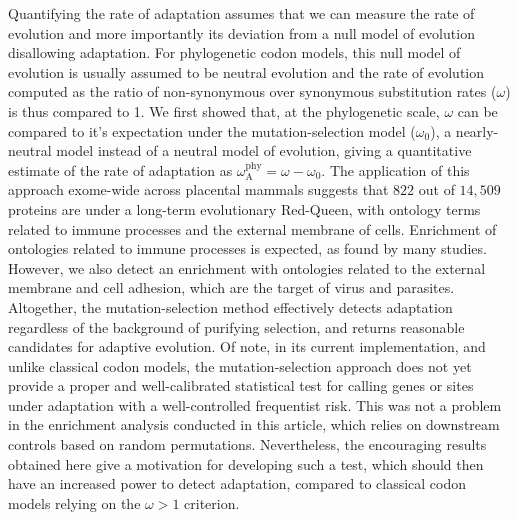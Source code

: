 \documentclass{article}
\newcommand{\rateApop}{\omega_{\mathrm{A}}}
\newcommand{\rateAphy}{\rateApop^{\mathrm{phy}}}
\begin{document}
    Quantifying the rate of adaptation assumes that we can measure the rate of evolution and more importantly its deviation from a null model of evolution disallowing adaptation.
    For phylogenetic codon models, this null model of evolution is usually assumed to be neutral evolution and the rate of evolution computed as the ratio of non-synonymous over synonymous substitution rates ($\omega$) is thus compared to 1.
    We first showed that, at the phylogenetic scale, $\omega$ can be compared to it's expectation under the mutation-selection model ($\omega_{0}$), a nearly-neutral model instead of a neutral model of evolution, giving a quantitative estimate of the rate of adaptation as $\rateAphy = \omega - \omega_{0}$.
    The application of this approach exome-wide across placental mammals suggests that $822$ out of $14,509$ proteins are under a long-term evolutionary Red-Queen, with ontology terms related to immune processes and the external membrane of cells.
    Enrichment of ontologies related to immune processes is expected, as found by many studies\cite{kosiol_patterns_2008, enard_viruses_2016, ebel_high_2017}.
    However, we also detect an enrichment with ontologies related to the external membrane and cell adhesion, which are the target of virus and parasites.
    Altogether, the mutation-selection method effectively detects adaptation regardless of the background of purifying selection, and returns reasonable candidates for adaptive evolution.
    Of note, in its current implementation, and unlike classical codon models\cite{wong_accuracy_2004, yang_paml_2007}, the mutation-selection approach does not yet provide a proper and well-calibrated statistical test for calling genes or sites under adaptation with a well-controlled frequentist risk.
    This was not a problem in the enrichment analysis conducted in this article, which relies on downstream controls based on random permutations.
    Nevertheless, the encouraging results obtained here give a motivation for developing such a test, which should then have an increased power to detect adaptation, compared to classical codon models relying on the $\omega > 1$ criterion.
\end{document}
